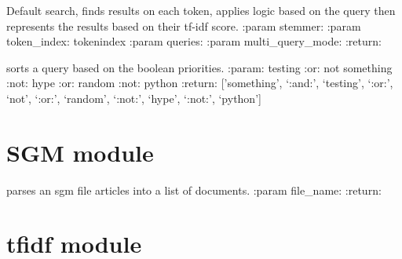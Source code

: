 \documentclass[letterpaper,10pt,english]{sphinxmanual}
\begin{document}

\begin{fulllineitems}
\label{\detokenize{querying:querying.simple_search}}
Default search, finds results on each token, applies logic based on the
query then represents the results based on their tf-idf score.
:param stemmer:
:param token\_index: tokenindex
:param queries:
:param multi\_query\_mode:
:return:

\end{fulllineitems}


\begin{fulllineitems}
\label{\detokenize{querying:querying.sort_query}}
sorts a query based on the boolean priorities.
:param: testing :or: not something :not: hype :or: random :not: python
:return: {[}'something', `:and:', `testing', `:or:', `not', `:or:', `random', `:not:', `hype', `:not:', `python'{]}

\end{fulllineitems}



\chapter{SGM module}
\label{\detokenize{SGM::doc}}\label{\detokenize{SGM:sgm-module}}\label{\detokenize{SGM:module-SGM}}

\begin{fulllineitems}
\label{\detokenize{SGM:SGM.reuters_SGM_processor}}
parses an sgm file articles into a list of documents.
:param file\_name:
:return:

\end{fulllineitems}



\chapter{tfidf module}
\label{\detokenize{tfidf:module-tfidf}}\label{\detokenize{tfidf::doc}}\label{\detokenize{tfidf:tfidf-module}}
\end{document}
